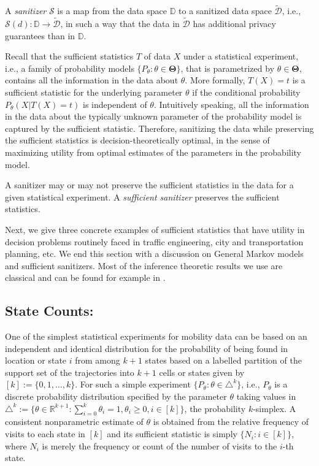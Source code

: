 \documentclass[times,twocolumn,final,authoryear]{elsarticle}
\begin{document}
A {\em sanitizer} $\mathcal{S}$ is a map from the data space $\mathbb{D}$ to a sanitized data space $\tilde{\mathcal{D}}$, i.e., $\mathcal{S}(d): \mathbb{D} \to \tilde{\mathcal{D}}$, in such a way that the data in $\tilde{\mathcal{D}}$ has additional privacy guarantees than in $\mathbb{D}$.
 

Recall that the sufficient statistics $T$ of data $X$ under a statistical experiment, i.e., a family of probability models $\{P_{\theta}: \theta \in \mathbf{\Theta}\}$, that is parametrized by $\theta \in \mathbf{\Theta}$, contains all the information in the data about $\theta$.  
More formally, $T(X)=t$ is a sufficient statistic for the underlying parameter $\theta$ if the conditional probability $P_{\theta}(X | T(X)=t)$ is independent of $\theta$.  
Intuitively speaking, all the information in the data about the typically unknown parameter of the probability model is captured by the sufficient statistic.  
Therefore, sanitizing the data while preserving the sufficient statistics is decision-theoretically optimal, in the sense of maximizing utility from optimal estimates of the parameters in the probability model.

 
A sanitizer may or may not preserve the sufficient statistics in the data for a given statistical experiment.
A {\em sufficient sanitizer} preserves the sufficient statistics. 

Next, we give three concrete examples of sufficient statistics that have utility in decision problems routinely faced in traffic engineering, city and transportation planning, etc.  
We end this section with a discussion on General Markov models and sufficient sanitizers.  Most of the inference theoretic results we use are classical and can be found for example in \cite{Billingsley:1961}.

\subsection{State Counts:}
One of the simplest statistical experiments for mobility data can be based on an independent and identical distribution for the probability of being found in location or state $i$ from among $k+1$ states based on a labelled partition of the support set of the trajectories into $k+1$ cells or states given by $[k] := \{0,1,\ldots,k\}$.  
For such a simple experiment $\{P_{\theta}: \theta \in \triangle^k \}$, i.e., $P_{\theta}$ is a discrete probability distribution specified by the 
parameter $\theta$ taking values in 
$\triangle^k := \{ \theta \in \mathbb{R}^{k+1} : \sum_{i=0}^k \theta_i = 1, \theta_i \geq 0, i \in [k] \}$, 
the probability $k$-simplex. 
A consistent nonparametric estimate of $\theta$ is obtained from the relative frequency of visits to each state in $[k]$ and its sufficient statistic is simply $\{N_i: i \in [k]\}$, where $N_i$ is merely the frequency or count of the number of visits to the $i$-th state.  
\end{document}
